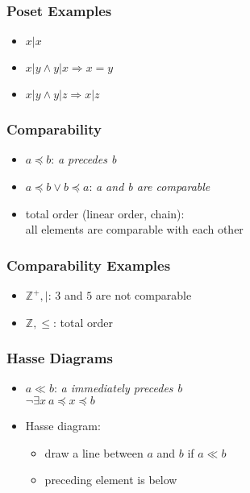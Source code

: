 \documentclass[dvipsnames]{beamer}
\begin{document}
\begin{frame}
  \frametitle{Poset Examples}

  \begin{example}[$\mathbb{Z}^+$, $|$]
    \begin{itemize}
      \item $x | x$
      \item $x | y \wedge y | x \Rightarrow x = y$
      \item $x | y \wedge y | z \Rightarrow x | z$
    \end{itemize}
  \end{example}
\end{frame}

\begin{frame}
  \frametitle{Comparability}

  \begin{itemize}
    \item $a \preceq b$: \emph{a precedes b}

    \medskip
    \item $a \preceq b \vee b \preceq a$: \emph{a and b are comparable}

    \pause
    \bigskip
    \item \alert{total order} (linear order, chain):\\
      all elements are comparable with each other
  \end{itemize}
\end{frame}

\begin{frame}
  \frametitle{Comparability Examples}

  \begin{example}
    \begin{itemize}
      \item $\mathbb{Z}^+,|$: $3$ and $5$ are not comparable

      \pause
      \medskip
      \item $\mathbb{Z},\leq$: total order
    \end{itemize}
  \end{example}
\end{frame}

\begin{frame}
  \frametitle{Hasse Diagrams}

  \begin{itemize}
    \item $a \ll b$: \emph{a immediately precedes b}\\
      $\neg \exists x~ a \preceq x \preceq b$

    \pause
    \medskip
    \item Hasse diagram:
    \begin{itemize}
      \item draw a line between $a$ and $b$ if $a \ll b$
      \item preceding element is below
    \end{itemize}
  \end{itemize}
\end{frame}
\end{document}
